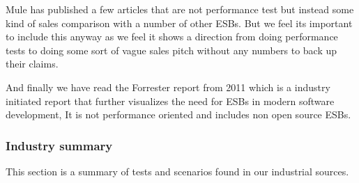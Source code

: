 Mule has published a few articles that are not performance test but instead some kind of sales comparison with a number of other ESBs\cite{mulevsjboss,mulevsglassfish,mulevsservicemix}.
But we feel its important to include this anyway as we feel it shows a direction from doing performance tests to doing some sort of vague sales pitch without any numbers to back up their claims.

And finally we have read the Forrester report \cite{forrester11} from 2011 which is a industry initiated report that further visualizes the need for ESBs in modern software development, It is not performance oriented and includes non open source ESBs.

\newpage
\subsubsection{Industry summary}
This section is a summary of tests and scenarios found in our industrial sources.

